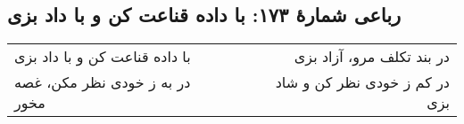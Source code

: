 \begin{center}
\section*{رباعی شمارهٔ ۱۷۳: با داده قناعت کن و با داد بزی}
\label{sec:173}
\begin{longtable}{l p{0.5cm} r}
با داده قناعت کن و با داد بزی
&&
در بند تکلف مرو، آزاد بزی
\\
در به ز خودی نظر مکن، غصه مخور
&&
در کم ز خودی نظر کن و شاد بزی
\\
\end{longtable}
\end{center}
